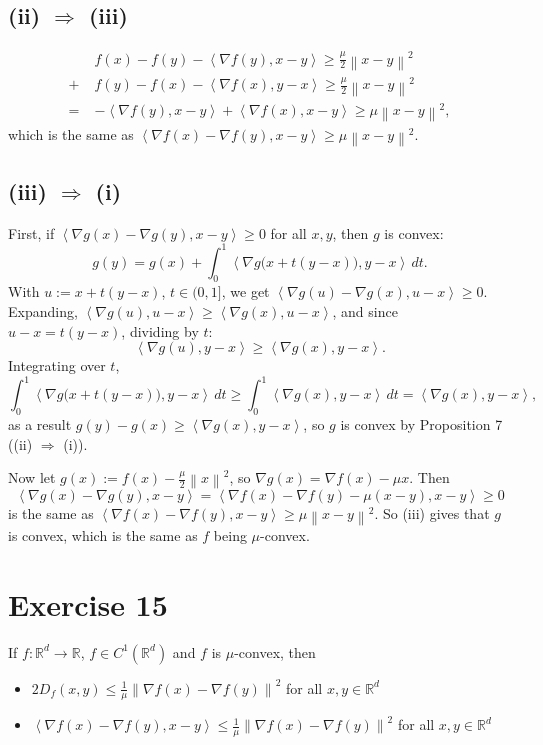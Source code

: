 \documentclass[11pt,a4paper]{article}
\newcommand{\R}{\mathbb{R}}
\newcommand{\norm}[1]{\left\| #1 \right\|}
\newcommand{\ip}[2]{\left\langle #1, #2 \right\rangle}
\begin{document}
\subsection*{(ii) $\Rightarrow$ (iii)}
\begin{align*}
  & f(x) - f(y) - \ip{\nabla f(y)}{x-y} \ge \tfrac{\mu}{2}\norm{x-y}^2 \\
+\; & f(y) - f(x) - \ip{\nabla f(x)}{y-x} \ge \tfrac{\mu}{2}\norm{x-y}^2 \\
=\; & -\ip{\nabla f(y)}{x-y} + \ip{\nabla f(x)}{x-y} \ge \mu\norm{x-y}^2,
\end{align*}
which is the same as $\ip{\nabla f(x) - \nabla f(y)}{x-y} \ge \mu\norm{x-y}^2$.

\subsection*{(iii) $\Rightarrow$ (i)}
First, if $\ip{\nabla g(x) - \nabla g(y)}{x-y} \ge 0$ for all $x, y$, then $g$ is convex:
\[
  g(y) = g(x) + \int_0^1 \ip{\nabla g\bigl(x + t(y-x)\bigr)}{y-x}\,dt .
\]
With $u := x + t(y-x)$, $t \in (0,1]$, we get
$\ip{\nabla g(u) - \nabla g(x)}{u-x} \ge 0$.
Expanding, $\ip{\nabla g(u)}{u-x} \ge \ip{\nabla g(x)}{u-x}$, and since $u - x = t(y-x)$,
dividing by $t$:
\[
  \ip{\nabla g(u)}{y-x} \ge \ip{\nabla g(x)}{y-x}.
\]
Integrating over $t$,
\[
  \int_0^1 \ip{\nabla g\bigl(x + t(y-x)\bigr)}{y-x}\,dt \ge \int_0^1 \ip{\nabla g(x)}{y-x}\,dt
  = \ip{\nabla g(x)}{y-x},
\]
as a result $g(y) - g(x) \ge \ip{\nabla g(x)}{y-x}$, so $g$ is convex by Proposition 7
((ii) $\Rightarrow$ (i)).

Now let $g(x) := f(x) - \frac{\mu}{2}\norm{x}^2$, so $\nabla g(x) = \nabla f(x) - \mu x$. Then
\[
  \ip{\nabla g(x) - \nabla g(y)}{x-y} = \ip{\nabla f(x) - \nabla f(y) - \mu(x-y)}{x-y} \ge 0
\]
is the same as $\ip{\nabla f(x) - \nabla f(y)}{x-y} \ge \mu\norm{x-y}^2$. So (iii) gives that
$g$ is convex, which is the same as $f$ being $\mu$-convex.

\section*{Exercise 15}

If $f : \R^d \to \R$, $f \in C^1(\R^d)$ and $f$ is $\mu$-convex, then
\begin{itemize}
  \item[(ii)] $2D_f(x,y) \le \frac{1}{\mu}\norm{\nabla f(x) - \nabla f(y)}^2$ for all $x, y \in \R^d$
  \item[(iii)] $\ip{\nabla f(x) - \nabla f(y)}{x-y} \le \frac{1}{\mu}\norm{\nabla f(x) - \nabla f(y)}^2$ for all $x, y \in \R^d$
\end{itemize}
\end{document}
